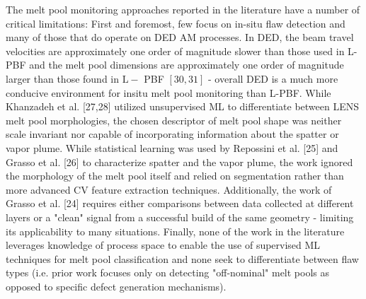 \documentclass[10pt]{article}
\begin{document}
The melt pool monitoring approaches reported in the literature have a number of critical limitations: First and foremost, few focus on in-situ flaw detection and many of those that do operate on DED AM processes. In DED, the beam travel velocities are approximately one order of magnitude slower than those used in L-PBF and the melt pool dimensions are approximately one order of magnitude larger than those found in $\mathrm{L}-$ PBF $[30,31]$ - overall DED is a much more conducive environment for insitu melt pool monitoring than L-PBF. While Khanzadeh et al. [27,28] utilized unsupervised ML to differentiate between LENS melt pool morphologies, the chosen descriptor of melt pool shape was neither scale invariant nor capable of incorporating information about the spatter or vapor plume. While statistical learning was used by Repossini et al. [25] and Grasso et al. [26] to characterize spatter and the vapor plume, the work ignored the morphology of the melt pool itself and relied on segmentation rather than more advanced CV feature extraction techniques. Additionally, the work of Grasso et al. [24] requires either comparisons between data collected at different layers or a "clean" signal from a successful build of the same geometry - limiting its applicability to many situations. Finally, none of the work in the literature leverages knowledge of process space to enable the use of supervised ML techniques for melt pool classification and none seek to differentiate between flaw types (i.e. prior work focuses only on detecting "off-nominal" melt pools as opposed to specific defect generation mechanisms).
\end{document}
